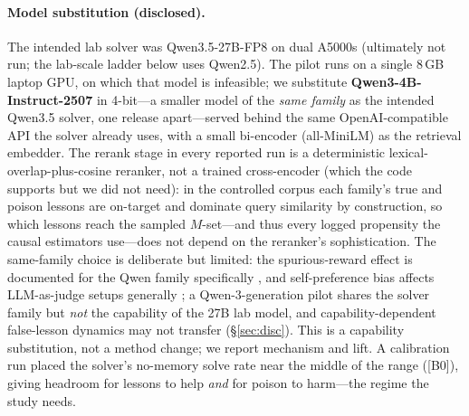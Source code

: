 \documentclass[10pt,twocolumn]{article}
\providecommand{\BzeroSolve}{[B0]}
\begin{document}
\paragraph{Model substitution (disclosed).} The intended lab solver was
Qwen3.5-27B-FP8 on dual A5000s (ultimately not run; the lab-scale ladder below uses
Qwen2.5). The pilot runs on a single 8\,GB laptop GPU, on which that model is
infeasible; we substitute \textbf{Qwen3-4B-Instruct-2507} in 4-bit---a smaller model
of the \emph{same family} as the intended Qwen3.5 solver, one release apart---served behind the same
OpenAI-compatible API the solver already uses, with a small bi-encoder (all-MiniLM)
as the retrieval embedder. The rerank stage in every reported run is a deterministic
lexical-overlap-plus-cosine reranker, not a trained cross-encoder (which the code
supports but we did not need): in the controlled corpus each family's true and poison
lessons are on-target and dominate query similarity by construction, so which lessons
reach the sampled $M$-set---and thus every logged propensity the causal estimators
use---does not depend on the reranker's sophistication. The same-family choice is deliberate but limited: the
spurious-reward effect is documented for the Qwen family specifically
\citep{SpuriousRewards}, and self-preference bias affects LLM-as-judge setups
generally \citep{JudgingTheJudges}; a Qwen-3-generation pilot shares the solver
family but \emph{not} the capability of the 27B lab model, and capability-dependent
false-lesson dynamics may not transfer (\S\ref{sec:disc}). This is a capability
substitution, not a method change; we report mechanism
and lift. A calibration run placed the solver's no-memory solve rate near the middle
of the range (\BzeroSolve{}), giving headroom for lessons to help \emph{and} for
poison to harm---the regime the study needs.
\end{document}
